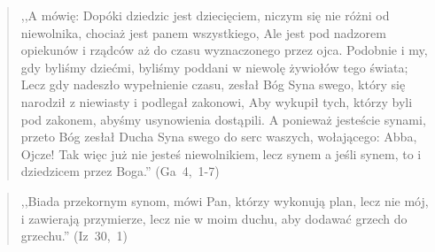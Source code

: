 \documentclass[10pt,a4paper,oneside]{article}
\begin{document}
\begin{quote}
,,A mówię: Dopóki dziedzic jest dziecięciem, niczym się nie różni od niewolnika, chociaż jest panem wszystkiego, Ale jest pod nadzorem opiekunów i rządców aż do czasu wyznaczonego przez ojca. Podobnie i my, gdy byliśmy dziećmi, byliśmy poddani w niewolę żywiołów tego świata; Lecz gdy nadeszło wypełnienie czasu, zesłał Bóg Syna swego, który się narodził z niewiasty i podlegał zakonowi, Aby wykupił tych, którzy byli pod zakonem, abyśmy usynowienia dostąpili. A ponieważ jesteście synami, przeto Bóg zesłał Ducha Syna swego do serc waszych, wołającego: Abba, Ojcze! Tak więc już nie jesteś niewolnikiem, lecz synem a jeśli synem, to i dziedzicem przez Boga.'' (Ga~4,~1-7)
\end{quote}
\begin{quote}
,,Biada przekornym synom, mówi Pan, którzy wykonują plan, lecz nie mój, i zawierają przymierze, lecz nie w moim duchu, aby dodawać grzech do grzechu.'' (Iz~30,~1)
\end{quote}
\end{document}
